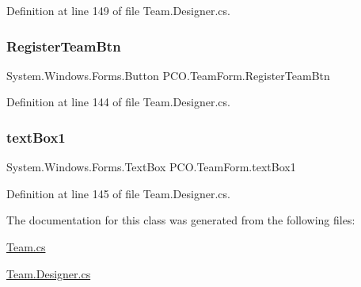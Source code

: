 Definition at line 149 of file Team.\+Designer.\+cs.

\mbox{\label{classPCO_1_1TeamForm_a0f3183f1f7a617f73ad921e563232099}} 
\subsubsection{\texorpdfstring{Register\+Team\+Btn}{RegisterTeamBtn}}
{\footnotesize\ttfamily System.\+Windows.\+Forms.\+Button P\+C\+O.\+Team\+Form.\+Register\+Team\+Btn\hspace{0.3cm}{\ttfamily [private]}}



Definition at line 144 of file Team.\+Designer.\+cs.

\mbox{\label{classPCO_1_1TeamForm_a77f8816df21a9f10e4ab566113233033}} 
\subsubsection{\texorpdfstring{text\+Box1}{textBox1}}
{\footnotesize\ttfamily System.\+Windows.\+Forms.\+Text\+Box P\+C\+O.\+Team\+Form.\+text\+Box1\hspace{0.3cm}{\ttfamily [private]}}



Definition at line 145 of file Team.\+Designer.\+cs.



The documentation for this class was generated from the following files\+:\begin{DoxyCompactItemize}
\item 
\hyperlink{Team_8cs}{Team.\+cs}\item 
\hyperlink{Team_8Designer_8cs}{Team.\+Designer.\+cs}\end{DoxyCompactItemize}

